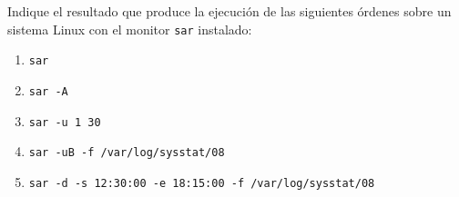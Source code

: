 \begin{comment}
    Solución: El monitor se activa cada 10 minutos (la última activación del día se hace a las $23:50$ horas). La información generada en cada activación (anchura de entrada) ocupa aproximadamente 20,7 KiB o 21,2 KB.
\end{comment}

\begin{ejercicio}
    Indique el resultado que produce la ejecución de las siguientes órdenes sobre un sistema Linux con el monitor \verb|sar| instalado:
    \begin{enumerate}
        \item \verb|sar|
        \item \verb|sar -A|
        \item \verb|sar -u 1 30|
        \item \verb|sar -uB -f /var/log/sysstat/08|
        \item \verb|sar -d -s 12:30:00 -e 18:15:00 -f /var/log/sysstat/08|
    \end{enumerate}
\end{ejercicio}
\begin{comment}
    Solución:
    \begin{enumerate}
        \item Utilización del procesador durante el día actual.
        \item Toda la información recogida durante el día actual.
        \item Utilización actual del procesador: 30 medidas tomadas con un período de un segundo.
        \item Utilización del procesador y paginación de la memoria virtual durante el día 8 del mes.
        \item Transferencias de disco desde las $12:30$ hasta las $18:15$ horas del día 8 del mes. 
    \end{enumerate}
\end{comment}

